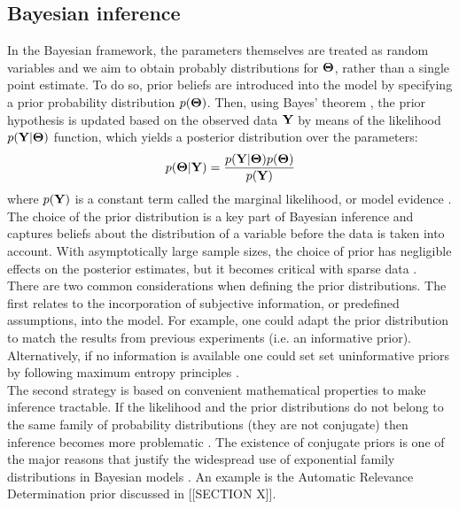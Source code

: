 \subsection{Bayesian inference}
In the Bayesian framework, the parameters themselves are treated as random variables and we aim to obtain probably distributions for $\mbox{\boldmath $\Theta$}$, rather than a single point estimate. To do so, prior beliefs are introduced into the model by specifying a prior probability distribution $p(\mbox{\boldmath $\Theta$})$. Then, using Bayes' theorem \cite{Bayes1763}, the prior hypothesis is updated based on the observed data ${\bf Y}$ by means of the likelihood $p({\bf Y}|\mbox{\boldmath $\Theta$})$ function, which yields a posterior distribution over the parameters:
\[
	p(\mbox{\boldmath $\Theta$}|{\bf Y}) = \frac{p({\bf Y}|\mbox{\boldmath $\Theta$}) p(\mbox{\boldmath $\Theta$})}{p({\bf Y})}
\]
where $p({\bf Y})$ is a constant term called the marginal likelihood, or model evidence \cite{Bishop,Murphy}.\\
The choice of the prior distribution is a key part of Bayesian inference and captures beliefs about the distribution of a variable before the data is taken into account. With asymptotically large sample sizes, the choice of prior has negligible effects on the posterior estimates, but it becomes critical with sparse data \cite{Bishop,Murphy,Gelman2013}.\\
There are two common considerations when defining the prior distributions. The first relates to the incorporation of subjective information, or predefined assumptions, into the model. For example, one could adapt the prior distribution to match the results from previous experiments (i.e. an informative prior). Alternatively, if no information is available one could set set uninformative priors by following maximum entropy principles \cite{Jaynes1968}.\\
The second strategy is based on convenient mathematical properties to make inference tractable. If the likelihood and the prior distributions do not belong to the same family of probability distributions (they are not conjugate) then inference becomes more problematic \cite{Raiffa1961,Bishop,Murphy,Gelman2013}. The existence of conjugate priors is one of the major reasons that justify the widespread use of exponential family distributions in Bayesian models \cite{XX}. An example is the Automatic Relevance Determination prior discussed in [[SECTION X]]. \\

